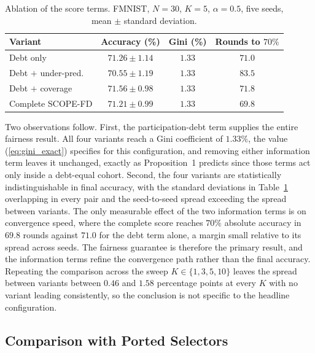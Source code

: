 \documentclass[journal]{IEEEtran}
\newcommand{\rev}[1]{#1}
\begin{document}
\begin{table}[t]
\centering
\caption{\rev{Ablation of the score terms. FMNIST, $N=30$, $K=5$, $\alpha=0.5$, five seeds, mean $\pm$ standard deviation.}}
\label{tab:ablation4}
\renewcommand{\arraystretch}{1.15}
\footnotesize
\setlength{\tabcolsep}{4pt}
\begin{tabular}{@{}lccc@{}}
\toprule
\textbf{Variant} & \textbf{Accuracy (\%)} & \textbf{Gini (\%)} & \textbf{Rounds to $70\%$} \\
\midrule
Debt only              & $71.26 \pm 1.14$ & $1.33$ & $71.0$ \\
Debt $+$ under-pred.   & $70.55 \pm 1.19$ & $1.33$ & $83.5$ \\
Debt $+$ coverage      & $71.56 \pm 0.98$ & $1.33$ & $71.8$ \\
Complete SCOPE-FD      & $71.21 \pm 0.99$ & $1.33$ & $69.8$ \\
\bottomrule
\end{tabular}
\end{table}

\rev{Two observations follow. First, the participation-debt term supplies the entire fairness result. All four variants reach a Gini coefficient of $1.33\%$, the value (\ref{eq:gini_exact}) specifies for this configuration, and removing either information term leaves it unchanged, exactly as Proposition~1 predicts since those terms act only inside a debt-equal cohort. Second, the four variants are statistically indistinguishable in final accuracy, with the standard deviations in Table~\ref{tab:ablation4} overlapping in every pair and the seed-to-seed spread exceeding the spread between variants. The only measurable effect of the two information terms is on convergence speed, where the complete score reaches $70\%$ absolute accuracy in $69.8$ rounds against $71.0$ for the debt term alone, a margin small relative to its spread across seeds. The fairness guarantee is therefore the primary result, and the information terms refine the convergence path rather than the final accuracy. Repeating the comparison across the sweep $K \in \{1, 3, 5, 10\}$ leaves the spread between variants between $0.46$ and $1.58$ percentage points at every $K$ with no variant leading consistently, so the conclusion is not specific to the headline configuration.}

\subsection{Comparison with Ported Selectors}
\label{ssec:exp-baselines}
\end{document}
